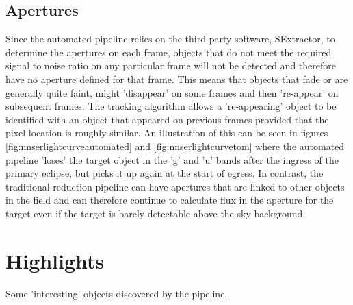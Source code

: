\subsection{Apertures}
Since the automated pipeline relies on the third party software, SExtractor, to determine the apertures on each frame, objects that do not meet the required signal to noise ratio on any particular frame will not be detected and therefore have no aperture defined for that frame. This means that objects that fade or are generally quite faint, might 'disappear' on some frames and then 're-appear' on subsequent frames. The tracking algorithm allows a 're-appearing' object to be identified with an object that appeared on previous frames provided that the pixel location is roughly similar. An illustration of this can be seen in figures \ref{fig:nnserlightcurveautomated} and \ref{fig:nnserlightcurvetom} where the automated pipeline 'loses' the target object in the 'g' and 'u' bands after the ingress of the primary eclipse, but picks it up again at the start of egress. In contrast, the traditional reduction pipeline can have apertures that are linked to other objects in the field and can therefore continue to calculate flux in the aperture for the target even if the target is barely detectable above the sky background.


\section{Highlights}

Some 'interesting' objects discovered by the pipeline.


